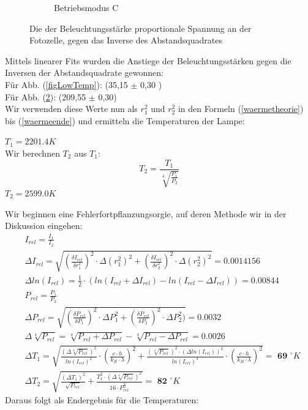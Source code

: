 \documentclass[12pt]{article}
\begin{document}
\begin{figure}
\begin{subfigure}{0.48\linewidth}
\caption{Betriebsmodus \label{figHighTemp} C}
\end{subfigure}
\caption{Die der Beleuchtungsstärke proportionale Spannung an der Fotozelle, gegen das Inverse des Abstandsquadrates}
\end{figure}

Mittels linearer Fits wurden die Anstiege der Beleuchtungsstärken gegen die Inversen der Abstandsquadrate gewonnen:\\
Für Abb. (\ref{figLowTemp}):  (35,15 $\pm$ 0,30 ) \\
Für Abb. (\ref{figHighTemp}): (209,55 $\pm$ 0,30) \\
Wir verwenden diese Werte nun als $r_1^2$ und $r_2^2$ in den Formeln (\ref{waermetheorie}) bis (\ref{waermeende}) und ermitteln die Temperaturen der Lampe: \\
\begin{center}
$T_1=2201.4 K$ \\
Wir berechnen $T_2$ aus $T_1$: \\
\begin{equation}
T_2=\frac{T_1}{\sqrt[4]{\frac{P_1}{P_2}}} 
\end{equation}
$T_2=2599.0 K$ \\
\end{center}
Wir beginnen eine Fehlerfortpflanzungsorgie, auf deren Methode wir in der Diskussion eingehen:
\begin{align*}
&I_{rel}=\frac{I_1}{I_2}\\
&\Delta I_{rel}=\sqrt{ \left(\frac{\delta I_{rel}}{\delta r_1^2}\right)^2 \cdot \Delta (r_1^2)^2 + \left(\frac{\delta I_{rel}}{\delta r_2^2}\right)^2 \cdot \Delta (r_2^2)^2 } = 0.0014156 \\
&\Delta ln (I_{rel})= \frac{1}{2} \cdot ( ln(I_{rel}+ \Delta I_{rel}) - ln ( I_{rel} - \Delta I_{rel}) ) =  0.00844\\
&P_{rel}=\frac{P_1}{P_2} \\
&\Delta P_{rel} = \sqrt{ \left(\frac{\delta P_{rel}}{\delta P_1}\right)^2 \cdot \Delta P_1^2 + \left(\frac{\delta P_{rel}}{\delta P_2}\right)^2 \cdot \Delta P_2^2)} =  0.0032 \\
&\Delta \sqrt[4]{P_{rel}} = \sqrt[4]{P_{rel}+ \Delta P_{rel}} -\sqrt[4]{P_{rel}-\Delta P_{rel}} = 0.0026 \\
&\Delta T_1 = \sqrt{ \frac{ (\Delta \sqrt[4]{P_{rel}})^2}{ln(I_{rel})^2} \cdot \left( \frac{c \cdot h}{k_B\cdot \lambda} \right) ^2 + \frac{ (\sqrt[4]{P_{rel}})^2 \cdot (\Delta ln(I_{rel}))^2}{ln(I_{rel})^4} \cdot \left( \frac{c \cdot h}{k_B \cdot \lambda}  \right) ^2} = \textbf{ 69 } ^{\circ} K \\
&\Delta T_2 = \sqrt{ \frac{ ( \Delta T_1)^2}{\sqrt{P_{rel}}} + \frac{T_1^2 \cdot ( \Delta \sqrt[4]{P_{rel}})^2}{16 \cdot P_{rel}^{\frac{6}{4}} } } = \textbf{ 82 } ^{\circ} K
\end{align*}
Daraus folgt als Endergebnis für die Temperaturen:
\begin{center}

\end{center}
\end{document}
